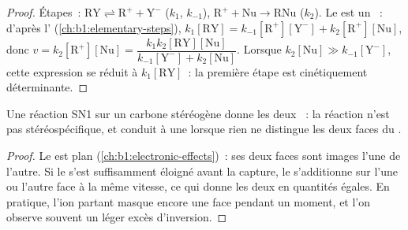 \begin{proof}
Étapes~: $\mathrm{RY} \rightleftharpoons \mathrm{R^+} + \mathrm{Y^-}$
($k_1$,
$k_{-1}$), $\mathrm{R^+} + \mathrm{Nu} \to \mathrm{RNu}$ ($k_2$). Le
 est un ~: d'après l' (\cref{ch:b1:elementary-steps}), $k_1[\mathrm{RY}] =
k_{-1}[\mathrm{R^+}][\mathrm{Y^-}] + k_2[\mathrm{R^+}][\mathrm{Nu}]$, donc
$v = k_2[\mathrm{R^+}][\mathrm{Nu}] = \dfrac{k_1k_2[\mathrm{RY}][\mathrm{Nu}]}
{k_{-1}[\mathrm{Y^-}] + k_2[\mathrm{Nu}]}$. Lorsque $k_2[\mathrm{Nu}] \gg
k_{-1}[\mathrm{Y^-}]$, cette expression se réduit à $k_1[\mathrm{RY}]$~:
la première étape est cinétiquement déterminante.
\end{proof}

\begin{proposition}[Stéréochimie de la SN1]\label{prop:b1:nucleophilic-substitution:sn1-stereo}
Une réaction SN1 sur un carbone stéréogène donne les deux
~: la réaction n'est pas stéréospécifique, et conduit à
une  lorsque rien ne distingue les deux faces du
.
\end{proposition}

\begin{proof}
Le  est plan (\cref{ch:b1:electronic-effects})~: ses deux
faces sont images l'une de l'autre. Si le  s'est
suffisamment éloigné avant la capture, le  s'additionne sur
l'une ou l'autre face à la même vitesse, ce qui donne les deux
 en quantités égales. En pratique, l'ion partant masque
encore une face pendant un moment, et l'on observe souvent un léger
excès d'inversion.
\end{proof}

